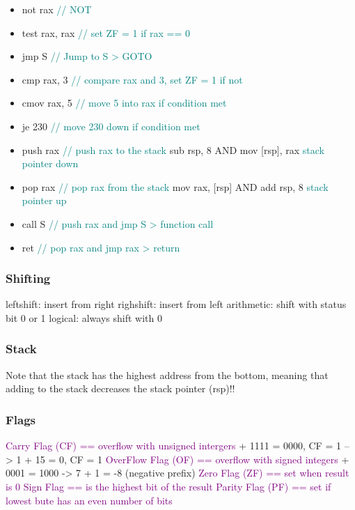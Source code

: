 \documentclass[main.tex,fontsize=7pt,paper=a4,paper=landscape,DIV=calc,]{scrartcl}
\begin{document}
\begin{multicols*}{4}
\begin{itemize}
\item not rax     \textcolor{teal}{// NOT}
\item test rax, rax \textcolor{teal}{// set ZF = 1 if rax == 0}
\item jmp S       \textcolor{teal}{// Jump to S > GOTO}
\item cmp rax, 3 \textcolor{teal}{// compare rax and 3, set ZF = 1 if not}
\item cmov rax, 5 \textcolor{teal}{// move 5 into rax if condition met}
\item je 230 \textcolor{teal}{// move 230 down if condition met}
\item push rax \textcolor{teal}{// push rax to the stack}\newline
  sub rsp, 8 AND mov [rsp], rax \textcolor{teal}{stack pointer down}
\item pop rax \textcolor{teal}{// pop rax from the stack}\newline
  mov rax, [rsp] AND add rsp, 8 \textcolor{teal}{stack pointer up}
\item call S \textcolor{teal}{// push rax and jmp S > function call}
\item ret    \textcolor{teal}{// pop rax and jmp rax > return}
\end{itemize}

\subsubsection{Shifting}
leftshift: insert from right\newline
righshift: insert from left\newline
arithmetic: shift with status bit 0 or 1\newline
logical: always shift with 0

\subsubsection{Stack}
Note that the stack has the highest address from the bottom, meaning that adding to the stack decreases the stack pointer (rsp)!!

\subsubsection{Flags}
\textcolor{purple}{Carry Flag (CF) == overflow with unsigned intergers} + 1111 = 0000, CF = 1 --> 1 + 15 = 0, CF = 1
\textcolor{purple}{OverFlow Flag (OF) == overflow with signed integers} + 0001 = 1000 -> 7 + 1 = -8 (negative prefix)
\textcolor{purple}{Zero Flag (ZF) == set when result is 0}
\textcolor{purple}{Sign Flag == is the highest bit of the result}
\textcolor{purple}{Parity Flag (PF) == set if lowest bute has an even number of bits}


\end{multicols*}
\end{document}
